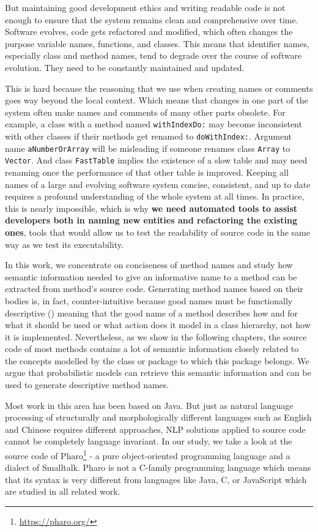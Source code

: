 But maintaining good development ethics and writing readable code is not enough to ensure that the system remains clean and comprehensive over time.  Software evolves, code gets refactored and modified, which often changes the purpose variable names, functions, and classes. This means that identifier names, especially class and method names, tend to degrade over the course of software evolution. They need to be constantly maintained and updated.

This is hard because the reasoning that we use when creating names or comments goes way beyond the local context. Which means that changes in one part of the system often make names and comments of many other parts obsolete. For example, a class with a method named \texttt{withIndexDo:} may become inconsistent with other classes if their methods get renamed to \texttt{doWithIndex:}. Argument name \texttt{aNumberOrArray} will be misleading if someone renames class \texttt{Array} to \texttt{Vector}. And class \texttt{FastTable} implies the existence of a slow table and may need renaming once the performance of that other table is improved. Keeping all names of a large and evolving software system concise, consistent, and up to date requires a profound understanding of the whole system at all times. In practice, this is nearly impossible, which is why \textbf{we need automated tools to assist developers both in naming new entities and refactoring the existing ones}, tools that would allow us to test the readability of source code in the same way as we test its executability.

In this work, we concentrate on conciseness of method names and study how semantic information needed to give an informative name to a method can be extracted from method's source code. Generating method names based on their bodies is, in fact, counter-intuitive because good names must be functionally descriptive (\cite{Alla15}) meaning that the good name of a method describes how and for what it should be used or what action does it model in a class hierarchy, not how it is implemented. Nevertheless, as we show in the following chapters, the source code of most methods contains a lot of semantic information closely related to the concepts modelled by the class or package to which this package belongs. We argue that probabilistic models can retrieve this semantic information and can be used to generate descriptive method names.

Most work in this area has been based on Java. But just as natural language processing of structurally and morphologically different languages such as English and Chinese requires different approaches, NLP solutions applied to source code cannot be completely language invariant. In our study, we take a look at the source code of Pharo\footnote{\url{https://pharo.org/}} - a pure object-oriented programming language and a dialect of Smalltalk. Pharo is not a C-family programming language which means that its syntax is very different from languages like Java, C, or JavaScript which are studied in all related work.


